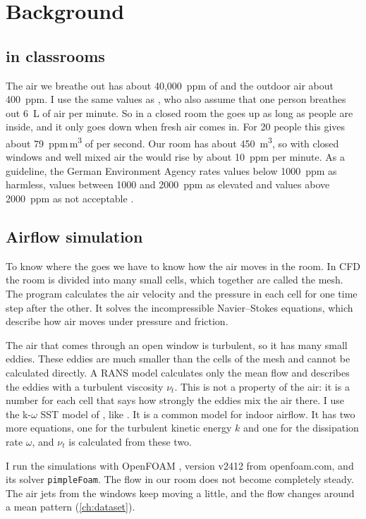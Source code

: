 \chapter{Background}
\label{ch:background}

\section{\cotwo{} in classrooms}
The air we breathe out has about 40,000~ppm of \cotwo{} and the outdoor air about 400~ppm. I use the same
values as \citet{bian2025}, who also assume that one person breathes out 6~L of air per minute. So in a closed
room the \cotwo{} goes up as long as people are inside, and it only goes down when fresh air comes in. For
20 people this gives about 79~ppm\,m\textsuperscript{3} of \cotwo{} per second. Our room has about
450~m\textsuperscript{3}, so with closed windows and well mixed air the \cotwo{} would rise by about 10~ppm
per minute. As a guideline, the German Environment Agency rates values below 1000~ppm as harmless, values between 1000
and 2000~ppm as elevated and values above 2000~ppm as not acceptable \citep{uba2008}.

\section{Airflow simulation}
To know where the \cotwo{} goes we have to know how the air moves in the room. In CFD the room is divided
into many small cells, which together are called the mesh. The program calculates the air velocity and the
pressure in each cell for one time step after the other. It solves the incompressible Navier--Stokes
equations, which describe how air moves under pressure and friction.

The air that comes through an open window is turbulent, so it has many small eddies. These eddies are much
smaller than the cells of the mesh and cannot be calculated directly. A RANS model calculates only the mean
flow and describes the eddies with a turbulent viscosity $\nu_t$. This is not a property of the air: it is a number
for each cell that says how strongly the eddies mix the air there. I use the k-$\omega$ SST model of
\citet{menter1994}, like \citet{bian2025}. It is a common model for indoor airflow. It has two more equations,
one for the turbulent kinetic energy $k$ and one for the dissipation rate $\omega$, and $\nu_t$ is calculated
from these two.

I run the simulations with OpenFOAM \citep{weller1998}, version v2412 from openfoam.com, and its solver
\texttt{pimpleFoam}. The flow in our room does not become completely steady. The air jets from the windows
keep moving a little, and the flow changes around a mean pattern (\cref{ch:dataset}).

